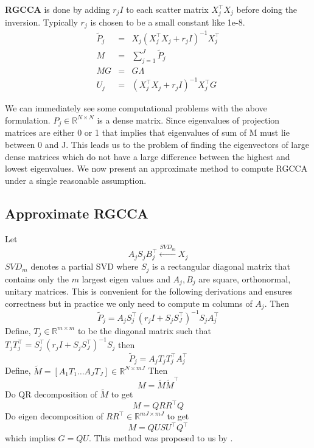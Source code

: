 \documentclass[11pt]{article}
\begin{document}
\textbf{RGCCA} is done by  adding $r_jI$ to each
scatter matrix $X_j^\top X_j$ before doing the inversion. Typically
$r_j$ is chosen to be a small constant like 1e-8.
\begin{eqnarray}
  \widetilde{P}_{j} &=& X_j(X_j^\top X_j+r_jI)^{-1}X_j^\top\\
  M &=& \sum_{j=1}^J \widetilde{P}_{j} \\
  MG &=& G\Lambda \\
  U_j &=& (X_j^\top X_j+r_jI)^{-1} X_j^\top G
\end{eqnarray}


We can immediately see some computational problems with the above formulation.
 $P_j \in \mathbb{R}^{N \times N}$ is a dense matrix. Since eigenvalues of
projection matrices are either 0 or 1 that implies 
that eigenvalues of sum of M must lie between 0 and J.
This leads us to the problem of finding the eigenvectors of large 
dense matrices which do not have a large difference between
the highest and lowest eigenvalues. We now present an approximate method
to compute RGCCA under a single reasonable assumption.

\subsection{Approximate RGCCA}
Let $$ A_{j} S_{j} B^\top_{j} \xleftarrow{SVD_{m}} X_j$$
$SVD_m$ denotes a partial SVD where $S_j$ is a rectangular diagonal
matrix that contains only the $m$ largest eigen values and $A_j, B_j$
are square, orthonormal, unitary matrices. This is
convenient for the following derivations and ensures correctness but in practice we only need to compute
m columns of $A_j$. Then
$$\widetilde{P}_j = A_j S_j^\top(r_j I + S_j S_J^\top)^{-1}S_j A_j^\top$$ 
Define, $T_j \in \mathbb{R}^{m \times m}$ to be the diagonal matrix such that
$T_jT_j^\top = S_j^\top(r_j I + S_j S_J^\top)^{-1}S_j $ then
$$\widetilde{P}_j = A_j T_j T_j^\top A_j^\top$$
Define, $\tilde{M} = \left[ A_1T_1 \ldots A_JT_J \right] \in \mathbb{R}^{N
  \times mJ}$
Then 
$$M = \tilde{M} \tilde{M}^\top$$
Do QR decomposition of $\tilde{M}$ to get
$$M = QRR^\top Q$$
Do eigen decomposition of $RR^\top \in \mathbb{R}^{mJ \times mJ}$
to get
$$M = Q U S U^\top Q^\top$$
 which implies $G = QU$. This method was proposed to us by \cite{savostyanov}.
\end{document}

